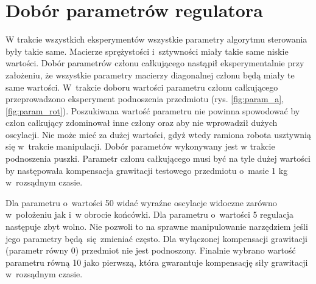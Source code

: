 \section{Dobór parametrów regulatora}
W trakcie wszystkich eksperymentów wszystkie parametry algorytmu sterowania były takie same. Macierze sprężystości i~sztywności miały takie same niskie wartości. Dobór parametrów członu całkującego nastąpił eksperymentalnie przy założeniu, że wszystkie parametry macierzy diagonalnej członu będą miały te same wartości. W~trakcie doboru wartości parametru członu całkującego przeprowadzono eksperyment podnoszenia przedmiotu (rys. \ref{fig:param_a}, \ref{fig:param_rot}). Poszukiwana wartość parametru nie powinna spowodować by człon całkujący zdominował inne człony oraz aby nie wprowadził dużych oscylacji. Nie może mieć za dużej wartości, gdyż wtedy ramiona robota usztywnią się w~trakcie manipulacji. Dobór parametów wykonywany jest w trakcie podnoszenia puszki. Parametr członu całkującego musi być na tyle dużej wartości by następowała kompensacja grawitacji testowego przedmiotu o~masie 1 kg w~rozsądnym czasie. 

Dla parametru o~wartości 50 widać wyraźne oscylacje widoczne zarówno w~położeniu jak i~w obrocie końcówki. Dla parametru o~wartości 5 regulacja następuje zbyt wolno. Nie pozwoli to na sprawne manipulowanie narzędziem jeśli jego parametry będą się zmieniać często. Dla wyłączonej kompensacji grawitacji (parametr równy 0) przedmiot nie jest podnoszony. Finalnie wybrano wartość parametru równą 10 jako pierwszą, która gwarantuje kompensację siły grawitacji w~rozsądnym czasie. 

